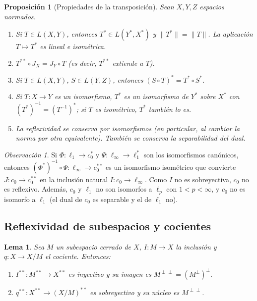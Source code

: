 \documentclass[11pt,a4paper]{article}
\newcommand{\norm}[1]{\lVert #1\rVert}
\theoremstyle{plain}
\newtheorem{lema}[teorema]{Lema}
\newtheorem{proposicion}[teorema]{Proposición}
\theoremstyle{definition}
\theoremstyle{remark}
\newtheorem{observacion}[teorema]{Observación}
\begin{document}
\begin{proposicion}[Propiedades de la transposición]
Sean $X,Y,Z$ espacios normados.
\begin{enumerate}[label=(\alph*)]
\item Si $T\in L(X,Y)$, entonces $T^*\in L(Y^*,X^*)$ y $\norm{T^*}=\norm T$. La aplicación $T\mapsto T^*$ es lineal e isométrica.
\item $T^{**}\circ J_X=J_Y\circ T$ (es decir, $T^{**}$ extiende a $T$).
\item Si $T\in L(X,Y)$, $S\in L(Y,Z)$, entonces $(S\circ T)^*=T^*\circ S^*$.
\item Si $T:X\to Y$ es un isomorfismo, $T^*$ es un isomorfismo de $Y^*$ sobre $X^*$ con $(T^*)^{-1}=(T^{-1})^*$; si $T$ es isométrico, $T^*$ también lo es.
\item La reflexividad se conserva por isomorfismos (en particular, al cambiar la norma por otra equivalente). También se conserva la separabilidad del dual.
\end{enumerate}
\end{proposicion}

\begin{observacion}
Si $\Phi:\ell_1\to c_0^*$ y $\Psi:\ell_\infty\to\ell_1^*$ son los isomorfismos canónicos, entonces $(\Phi^*)^{-1}\circ\Psi:\ell_\infty\to c_0^{**}$ es un isomorfismo isométrico que convierte $J:c_0\to c_0^{**}$ en la inclusión natural $I:c_0\to\ell_\infty$. Como $I$ no es sobreyectiva, $c_0$ no es reflexivo. Además, $c_0$ y $\ell_1$ no son isomorfos a $\ell_p$ con $1<p<\infty$, y $c_0$ no es isomorfo a $\ell_1$ (el dual de $c_0$ es separable y el de $\ell_1$ no).
\end{observacion}

\subsection{Reflexividad de subespacios y cocientes}

\begin{lema}
Sea $M$ un subespacio cerrado de $X$, $I:M\to X$ la inclusión y $q:X\to X/M$ el cociente. Entonces:
\begin{enumerate}[label=(\roman*)]
\item $I^{**}:M^{**}\to X^{**}$ es inyectivo y su imagen es $M^{\perp\perp}=(M^\perp)^\perp$.
\item $q^{**}:X^{**}\to(X/M)^{**}$ es sobreyectivo y su núcleo es $M^{\perp\perp}$.
\end{enumerate}
\end{lema}
\end{document}
